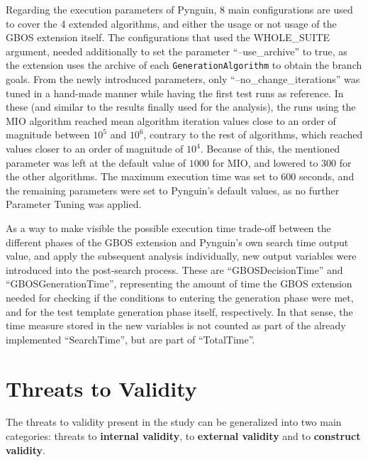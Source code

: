 \documentclass[%
  chapterprefix=false,%
  open=right,%
  twoside=true,%
  paper=a4,%
  logofile={Figures/logo.png},%
  thesistype=master,%
  UKenglish,%
]{se2thesis}
\newcommand{\classname}[1]{\texttt{#1}}
\begin{document}
Regarding the execution parameters of Pynguin, 8 main configurations are used to cover the 4 extended algorithms, and either the usage or not usage of the GBOS extension itself.
The configurations that used the WHOLE\_SUITE argument, needed additionally to set the parameter ``--use\_archive'' to true, as the extension uses the archive of each \classname{GenerationAlgorithm} to obtain the branch goals.
From the newly introduced parameters, only ``--no\_change\_iterations'' was tuned in a hand-made manner while having the first test runs as reference.
In these (and similar to the results finally used for the analysis), the runs using the MIO algorithm reached mean algorithm iteration values close to an order of magnitude between \(10^5\) and \(10^6\), contrary to the rest of algorithms, which reached values closer to an order of magnitude of \(10^4\).
Because of this, the mentioned parameter was left at the default value of \(1000\) for MIO, and lowered to \(300\) for the other algorithms.
The maximum execution time was set to 600 seconds, and the remaining parameters were set to Pynguin's default values, as no further Parameter Tuning was applied.

As a way to make visible the possible execution time trade-off between the different phases of the GBOS extension and Pynguin's own search time output value, and apply the subsequent analysis individually, new output variables were introduced into the post-search process.
These are ``GBOSDecisionTime'' and ``GBOSGenerationTime'', representing the amount of time the GBOS extension needed for checking if the conditions to entering the generation phase were met, and for the test template generation phase itself, respectively.
In that sense, the time measure stored in the new variables is not counted as part of the already implemented ``SearchTime'', but are part of ``TotalTime''.

\section{Threats to Validity}

The threats to validity present in the study can be generalized into two main categories: threats to \textbf{internal validity}, to \textbf{external validity} and to \textbf{construct validity}.
\end{document}

